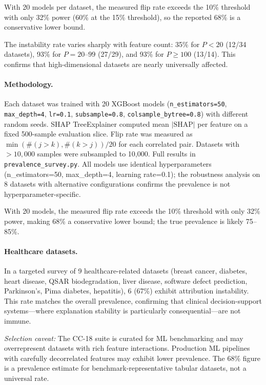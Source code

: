 \documentclass{article}
\begin{document}
With 20 models per dataset, the measured flip rate exceeds the 10\% threshold with only 32\% power (60\% at the 15\% threshold), so the reported 68\% is a conservative lower bound.

The instability rate varies sharply with feature count: 35\% for $P < 20$ (12/34 datasets), 93\% for $P = 20$--$99$ (27/29), and 93\% for $P \geq 100$ (13/14). This confirms that high-dimensional datasets are nearly universally affected.

\paragraph{Methodology.}
\begin{sloppypar}
Each dataset was trained with 20 XGBoost models (\texttt{n\_estimators=50},
\texttt{max\_depth=4}, \texttt{lr=0.1}, \texttt{subsample=0.8},
\texttt{colsample\_bytree=0.8}) with different random seeds. SHAP TreeExplainer
computed mean $|\text{SHAP}|$ per feature on a fixed 500-sample evaluation slice.
Flip rate was measured as $\min(\#(j{>}k), \#(k{>}j)) / 20$ for each correlated
pair. Datasets with $> 10{,}000$ samples were subsampled to 10{,}000. Full results
in \texttt{prevalence\_survey.py}.
All models use identical hyperparameters (n\_estimators=50, max\_depth=4, learning rate=0.1); the robustness analysis on 8 datasets with alternative configurations confirms the prevalence is not hyperparameter-specific.
\end{sloppypar}

With 20 models, the measured flip rate exceeds the 10\% threshold with only 32\% power, making 68\% a conservative lower bound; the true prevalence is likely 75--85\%.

\paragraph{Healthcare datasets.}
In a targeted survey of 9 healthcare-related datasets (breast cancer, diabetes, heart disease, QSAR biodegradation, liver disease, software defect prediction, Parkinson's, Pima diabetes, hepatitis), 6 (67\%) exhibit attribution instability. This rate matches the overall prevalence, confirming that clinical decision-support systems---where explanation stability is particularly consequential---are not immune.

\emph{Selection caveat:} The CC-18 suite is curated for ML benchmarking and may overrepresent datasets with rich feature interactions. Production ML pipelines with carefully decorrelated features may exhibit lower prevalence. The 68\% figure is a prevalence estimate for benchmark-representative tabular datasets, not a universal rate.
\end{document}
